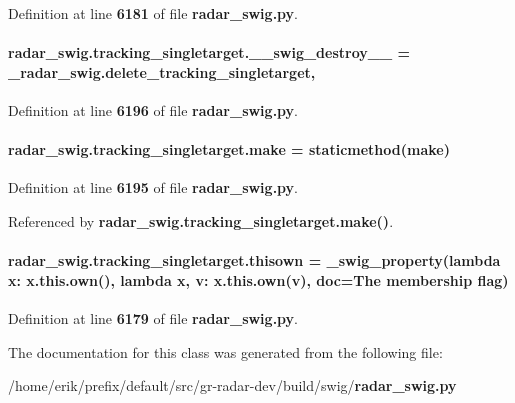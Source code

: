 Definition at line {\bf 6181} of file {\bf radar\+\_\+swig.\+py}.

\paragraph[{\+\_\+\+\_\+swig\+\_\+destroy\+\_\+\+\_\+}]{\setlength{\rightskip}{0pt plus 5cm}radar\+\_\+swig.\+tracking\+\_\+singletarget.\+\_\+\+\_\+swig\+\_\+destroy\+\_\+\+\_\+ = \+\_\+radar\+\_\+swig.\+delete\+\_\+tracking\+\_\+singletarget\hspace{0.3cm}{\ttfamily [static]}, {\ttfamily [private]}}\label{classradar__swig_1_1tracking__singletarget_a1af414d0af599f98ba9fcca6b1e0a8f3}


Definition at line {\bf 6196} of file {\bf radar\+\_\+swig.\+py}.

\paragraph[{make}]{\setlength{\rightskip}{0pt plus 5cm}radar\+\_\+swig.\+tracking\+\_\+singletarget.\+make = staticmethod(make)\hspace{0.3cm}{\ttfamily [static]}}\label{classradar__swig_1_1tracking__singletarget_a5d98f25b8fc9c1b5eef4463c814c61ce}


Definition at line {\bf 6195} of file {\bf radar\+\_\+swig.\+py}.



Referenced by {\bf radar\+\_\+swig.\+tracking\+\_\+singletarget.\+make()}.

\paragraph[{thisown}]{\setlength{\rightskip}{0pt plus 5cm}radar\+\_\+swig.\+tracking\+\_\+singletarget.\+thisown = {\bf \+\_\+swig\+\_\+property}(lambda x\+: x.\+this.\+own(), lambda {\bf x}, v\+: x.\+this.\+own(v), doc=\textquotesingle{}The membership flag\textquotesingle{})\hspace{0.3cm}{\ttfamily [static]}}\label{classradar__swig_1_1tracking__singletarget_a4dccc3d814dc4d9b114934c69fb16a83}


Definition at line {\bf 6179} of file {\bf radar\+\_\+swig.\+py}.



The documentation for this class was generated from the following file\+:\begin{DoxyCompactItemize}
\item 
/home/erik/prefix/default/src/gr-\/radar-\/dev/build/swig/{\bf radar\+\_\+swig.\+py}\end{DoxyCompactItemize}
